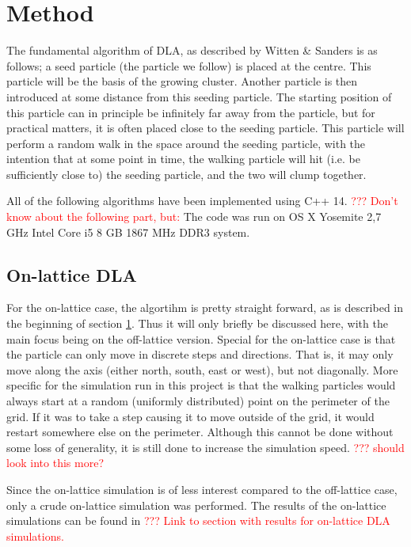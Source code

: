 \section{Method}
\label{sec:method}
The fundamental algorithm of DLA, as described by Witten \& Sanders \cite{PhysRevLett.47.1400} is as follows; a seed particle (the particle we follow) is placed at the centre. This particle will be the basis of the growing cluster. Another particle is then introduced at some distance from this seeding particle. The starting position of this particle can in principle be infinitely far away from the particle, but for practical matters, it is often placed close to the seeding particle. This particle will perform a random walk in the space around the seeding particle, with the intention that at some point in time, the walking particle will hit (i.e. be sufficiently close to) the seeding particle, and the two will clump together. 

All of the following algorithms have been implemented using C++ 14. \textcolor{red}{??? Don't know about the following part, but:} The code was run on OS X Yosemite 2,7 GHz Intel Core i5 8 GB 1867 MHz DDR3 system.

\subsection{On-lattice DLA}
\label{sec:on-lattice_method}
For the on-lattice case, the algortihm is pretty straight forward, as is described in the beginning of section \ref{sec:method}. Thus it will only briefly be discussed here, with the main focus being on the off-lattice version. Special for the on-lattice case is that the particle can only move in discrete steps and directions. That is, it may only move along the axis (either north, south, east or west), but not diagonally. More specific for the simulation run in this project is that the walking particles would always start at a random (uniformly distributed) point on the perimeter of the grid. If it was to take a step causing it to move outside of the grid, it would restart somewhere else on the perimeter. Although this cannot be done without some loss of generality, it is still done to increase the simulation speed. \textcolor{red}{??? should look into this more?}

Since the on-lattice simulation is of less interest compared to the off-lattice case, only a crude on-lattice simulation was performed. The results of the on-lattice simulations can be found in \textcolor{red}{??? Link to section with results for on-lattice DLA simulations. }

